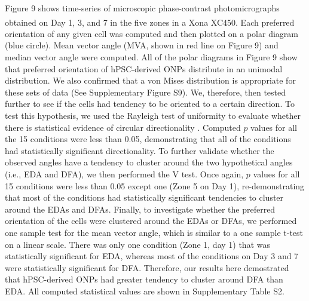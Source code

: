 \documentclass[review]{elsarticle}
\begin{document}
\indent Figure 9 shows time-series of microscopic phase-contrast photomicrographs obtained on Day 1, 3, and 7 in the five zones in a Xona\textsuperscript{\texttrademark} XC450. Each preferred orientation of any given cell was computed and then plotted on a polar diagram (blue circle). Mean vector angle (MVA, shown in red line on Figure 9) and median vector angle were computed. All of the polar diagrams in Figure 9 show that preferred orientation of hPSC-derived ONPs distribute in an unimodal distribution. We also confirmed that a von Mises distribution is appropriate for these sets of data (See Supplementary Figure S9). We, therefore, then tested further to see if the cells had tendency to be oriented to a certain direction. To test this hypothesis, we used the Rayleigh test of uniformity to evaluate whether there is statistical evidence of circular directionality \cite{Batschelet1981}. Computed $p$ values for all the 15 conditions were less than 0.05, demonstrating that all of the conditions had statistically significant directionality. To further validate whether the observed angles have a tendency to cluster around the two hypothetical angles (i.e., EDA and DFA), we then performed the V test. Once again, $p$ values for all 15 conditions were less than 0.05 except one (Zone 5 on Day 1), re-demonstrating that most of the conditions had statistically significant tendencies to cluster around the EDAs and DFAs. Finally, to investigate whether the preferred orientation of the cells were clustered around the EDAs or DFAs, we performed one sample test for the mean vector angle, which is similar to a one sample t-test on a linear scale. There was only one condition (Zone 1, day 1) that was statistically significant for EDA, whereas most of the conditions on Day 3 and 7 were statistically significant for DFA. Therefore, our results here demostrated that hPSC-derived ONPs had greater tendency to cluster around DFA than EDA. All computed statistical values are shown in Supplementary Table S2.
\end{document}
